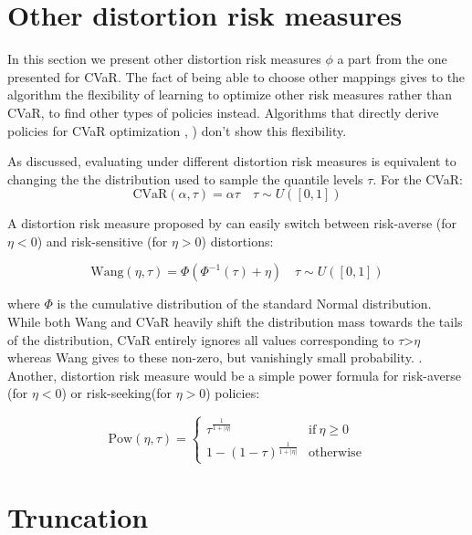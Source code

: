 \section{Other distortion risk measures}

In this section we present other distortion risk measures $\phi$ a part from 
the one presented for CVaR.
The fact of being able to choose other mappings gives to the algorithm the flexibility of 
learning to optimize other risk measures rather than CVaR, to find other types of policies instead.
Algorithms that directly derive policies for CVaR optimization \citep{Chow2014},\citep{Tamar2015a} )
don't show this flexibility.

As discussed, evaluating under different distortion risk measures is equivalent to
changing the the distribution used to sample the quantile levels $\tau$.
For the CVaR:
\begin{equation}
    \text{CVaR}(\alpha, \tau)=\alpha\tau \quad \tau \sim U([0,1])
\end{equation}

A distortion risk measure proposed by \citet{Wang2000} can easily switch between
risk-averse (for $\eta<0$) and risk-sensitive (for $\eta>0$) distortions:

\begin{equation}
    \text{Wang}(\eta, \tau) = \Phi (\Phi ^{-1}(\tau) + \eta) \quad \tau \sim U([0,1])
\end{equation}

where $\Phi$ is the cumulative distribution of the standard Normal distribution.
While both Wang and CVaR heavily shift the distribution mass towards the
tails of the distribution,  CVaR entirely ignores all values corresponding to $\tau$>$\eta$
whereas Wang gives to these non-zero, but vanishingly small probability. \citep{Dabney2018b}.
Another, distortion risk measure would be a simple power formula
for risk-averse (for $\eta<0$) or risk-seeking(for $\eta>0$) policies:

\begin{equation}
    \text{Pow}(\eta,\tau)  = \left\{
	    \begin{array}{ll}
		 \tau ^ {\frac{1}{1+|\eta|}}      & \mathrm{if\ } \eta \ge 0 \\
		 1-(1-\tau)^{\frac{1}{1+|\eta|}}      & \mathrm{otherwise }
        \end{array}
        \right.
\end{equation}

\section{Truncation}

